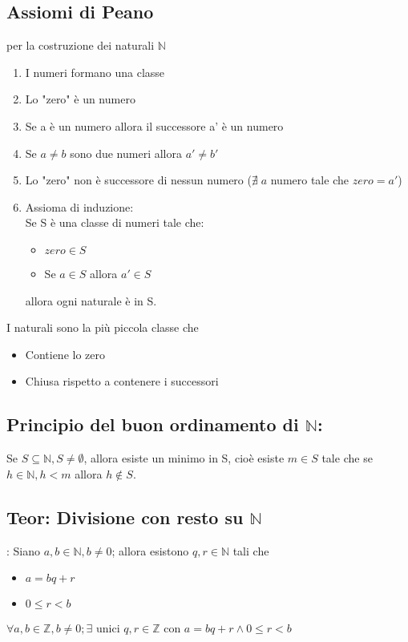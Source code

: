 \subsection{Assiomi di Peano} per la costruzione dei naturali \(\mathbb{N}\)
\begin{enumerate}
    \item I numeri formano una classe
    \item Lo "zero" è un numero
    \item Se a è un numero allora il successore a' è un numero
    \item Se \(a\neq b\) sono due numeri allora \(a'\neq b'\)
    \item Lo "zero" non è successore di nessun numero (\(\nexists \; a\) numero tale che \(zero=a'\))
    \item Assioma di induzione:
    \\Se S è una classe di numeri tale che:
    \begin{itemize}
        \item \(zero\in S\)
        \item Se \(a\in S\) allora \(a'\in S\)
    \end{itemize}
    allora ogni naturale è in S.
\end{enumerate}
I naturali sono la più piccola classe che 
\begin{itemize}
    \item Contiene lo zero
    \item Chiusa rispetto a contenere i successori
\end{itemize}

\subsection{Principio del buon ordinamento di \(\mathbb{N}\):} Se \(S\subseteq \mathbb{N}, S\neq\emptyset\), allora esiste un minimo in S, cioè esiste \(m\in S\) tale che se \(h\in\mathbb{N}, h<m\) allora \(h\notin S\).

\subsection{Teor: Divisione con resto su \(\mathbb{N}\)}: Siano \(a,b\in\mathbb{N}, b\neq 0\); allora esistono \(q, r\in\mathbb{N}\) tali che
\begin{itemize}
    \item \(a=bq+r\)
    \item \(0\leq r<b\)
\end{itemize}
\(\forall a,b\in\mathbb{Z}, b\neq 0; \exists\) unici \(q, r\in\mathbb{Z}\) con \(a=bq+r \land 0\leq r<b\)

